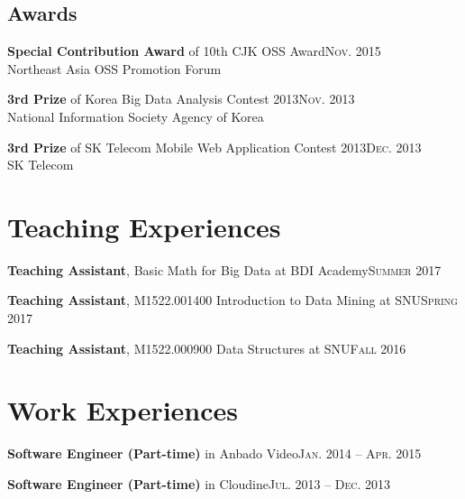 \documentclass[11pt,a4paper]{article}
\renewenvironment{itemize}{
  \begin{list}{}{
    \setlength{\leftmargin}{1.5em}
    \setlength{\itemsep}{0.5em}
    \setlength{\parskip}{0pt}
    \setlength{\parsep}{0.25em}
  }
}{
  \end{list}
}
\begin{document}
\subsection*{Awards}
\begin{itemize}
  \item \textbf{Special Contribution Award} of 10th CJK OSS Award\hfill\textsc{Nov. 2015}\\
        Northeast Asia OSS Promotion Forum
  \item \textbf{3rd Prize} of Korea Big Data Analysis Contest 2013\hfill\textsc{Nov. 2013}\\
        National Information Society Agency of Korea
  \item \textbf{3rd Prize} of SK Telecom Mobile Web Application Contest 2013\hfill\textsc{Dec. 2013}\\
        SK Telecom
\end{itemize}

\section*{Teaching Experiences}
\begin{itemize}
	\setlength\itemsep{0.1em}
	\item \textbf{Teaching Assistant}, Basic Math for Big Data at BDI Academy\hfill\textsc{Summer 2017}
	\item \textbf{Teaching Assistant}, M1522.001400 Introduction to Data Mining at SNU\hfill\textsc{Spring 2017}
	\item \textbf{Teaching Assistant}, M1522.000900 Data Structures at SNU\hfill\textsc{Fall 2016}
\end{itemize}

\section*{Work Experiences}
\begin{itemize}
	\setlength\itemsep{0.1em}
  \item \textbf{Software Engineer (Part-time)} in Anbado Video\hfill\textsc{Jan. 2014 -- Apr. 2015}
  \item \textbf{Software Engineer (Part-time)} in Cloudine\hfill\textsc{Jul. 2013 -- Dec. 2013}
\end{itemize}

\end{document}
